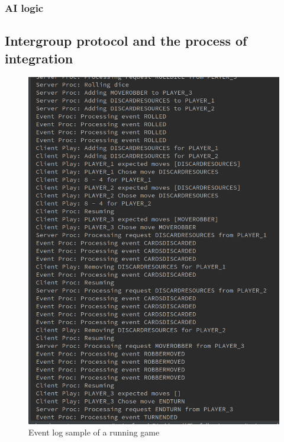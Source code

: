 \documentclass[a4paper,doc,draftfirst]{apa6}
\begin{document}
\subsubsection{AI logic}


\subsection{Intergroup protocol and the process of integration}
\begin{figure}[hbtp]
      \includegraphics[width=\textwidth]{eventlog}
      \caption{Event log sample of a running game}
\end{figure}
\end{document}
